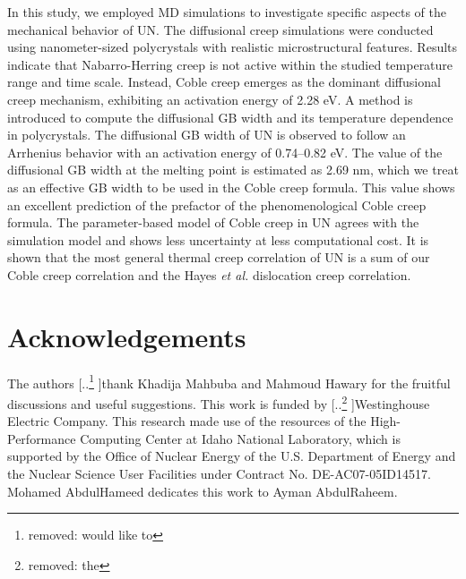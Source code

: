 \documentclass[preprint,12pt,sort&compress]{elsarticle} %
\newcommand{\?}{\stackrel{?}{=}}
\providecommand{\DIFaddtex}[1]{{\sf #1}} %
\providecommand{\DIFdeltex}[1]{{[..\footnote{removed: #1} ]}} %
\providecommand{\DIFaddbegin}{\protect\color{blue}} %
\providecommand{\DIFaddend}{\protect\color{black}} %
\providecommand{\DIFdelbegin}{\protect\color{red}} %
\providecommand{\DIFdelend}{\protect\color{black}} %
\providecommand{\DIFadd}[1]{\texorpdfstring{\DIFaddtex{#1}}{#1}} %
\providecommand{\DIFdel}[1]{\texorpdfstring{\DIFdeltex{#1}}{}} %
\newcommand{\DIFscaledelfig}{0.5}
\newlength{\DIFdelgraphicswidth} %
\newlength{\DIFdelgraphicsheight} %
\newcommand{\DIFaddincludegraphics}[2][]{{\color{blue}\fbox{\DIFOincludegraphics[#1]{#2}}}} %
\newcommand{\DIFdelincludegraphics}[2][]{%
\sbox{\DIFdelgraphicsbox}{\DIFOincludegraphics[#1]{#2}}%
\settoboxwidth{\DIFdelgraphicswidth}{\DIFdelgraphicsbox} %
\settoboxtotalheight{\DIFdelgraphicsheight}{\DIFdelgraphicsbox} %
\scalebox{\DIFscaledelfig}{%
\parbox[b]{\DIFdelgraphicswidth}{\usebox{\DIFdelgraphicsbox}\\[-\baselineskip] \rule{\DIFdelgraphicswidth}{0em}}\llap{\resizebox{\DIFdelgraphicswidth}{\DIFdelgraphicsheight}{%
\setlength{\unitlength}{\DIFdelgraphicswidth}%
\begin{picture}(1,1)%
\thicklines\linethickness{2pt} %
{\color[rgb]{1,0,0}\put(0,0){\framebox(1,1){}}}%
{\color[rgb]{1,0,0}\put(0,0){\line( 1,1){1}}}%
{\color[rgb]{1,0,0}\put(0,1){\line(1,-1){1}}}%
\end{picture}%
}\hspace*{3pt}}} %
} %
\DeclareRobustCommand{\DIFaddbegin}{\DIFOaddbegin \let\includegraphics\DIFaddincludegraphics} %
\DeclareRobustCommand{\DIFaddend}{\DIFOaddend \let\includegraphics\DIFOincludegraphics} %
\DeclareRobustCommand{\DIFdelbegin}{\DIFOdelbegin \let\includegraphics\DIFdelincludegraphics} %
\DeclareRobustCommand{\DIFdelend}{\DIFOaddend \let\includegraphics\DIFOincludegraphics} %
\begin{document}
In this study, we employed MD simulations to investigate specific aspects of the mechanical behavior of UN. The diffusional creep simulations were conducted using nanometer-sized polycrystals with realistic microstructural features. Results indicate that Nabarro-Herring creep is not active within the studied temperature range and time scale. Instead, Coble creep emerges as the dominant diffusional creep mechanism, exhibiting an activation energy of 2.28 eV. A method is introduced to compute the diffusional GB width and its temperature dependence in polycrystals. The diffusional GB width of UN is observed to follow an Arrhenius behavior with an activation energy of 0.74--0.82 eV. The value of the diffusional GB width at the melting point is estimated as 2.69 nm\DIFaddbegin \DIFadd{, }\DIFaddend which we treat as an effective GB width to be used in the Coble creep formula. This value shows an excellent prediction of the prefactor of the phenomenological Coble creep formula. The parameter-based model of Coble creep in UN agrees with the simulation model and shows less uncertainty at less computational cost. It is shown that the most general thermal creep correlation of UN is a sum of our Coble creep correlation and the Hayes \textit{et al.} dislocation creep correlation.


\section{Acknowledgements}

The authors \DIFdelbegin \DIFdel{would like to }\DIFdelend thank Khadija Mahbuba and Mahmoud Hawary for the fruitful discussions and useful suggestions. This work is funded by \DIFdelbegin \DIFdel{the }\DIFdelend Westinghouse Electric Company. This research made use of the resources of the High-Performance Computing Center at Idaho National Laboratory, which is supported by the Office of Nuclear Energy of the U.S. Department of Energy and the Nuclear Science User Facilities under Contract No. DE-AC07-05ID14517. Mohamed AbdulHameed dedicates this work to Ayman AbdulRaheem.
\end{document}
